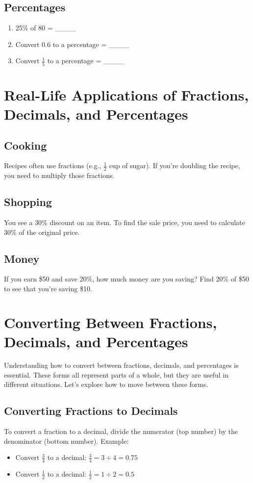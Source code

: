 \subsection{Percentages}
\begin{enumerate}
    \item 25\% of 80 = \_\_\_\_
    \item Convert 0.6 to a percentage = \_\_\_\_
    \item Convert $\frac{1}{5}$ to a percentage = \_\_\_\_
\end{enumerate}

\section{Real-Life Applications of Fractions, Decimals, and Percentages}
\subsection{Cooking}
Recipes often use fractions (e.g., $\frac{1}{2}$ cup of sugar). If you’re doubling the recipe, you need to multiply those fractions.

\subsection{Shopping}
You see a 30\% discount on an item. To find the sale price, you need to calculate 30\% of the original price.

\subsection{Money}
If you earn \$50 and save 20\%, how much money are you saving? Find 20\% of \$50 to see that you’re saving \$10.

\section{Converting Between Fractions, Decimals, and Percentages}
Understanding how to convert between fractions, decimals, and percentages is essential. These forms all represent parts of a whole, but they are useful in different situations. Let's explore how to move between these forms.

\subsection{Converting Fractions to Decimals}
To convert a fraction to a decimal, divide the numerator (top number) by the denominator (bottom number). Example:
\begin{itemize}
    \item Convert $\frac{3}{4}$ to a decimal: $\frac{3}{4} = 3 \div 4 = 0.75$
    \item Convert $\frac{1}{2}$ to a decimal: $\frac{1}{2} = 1 \div 2 = 0.5$
\end{itemize}

